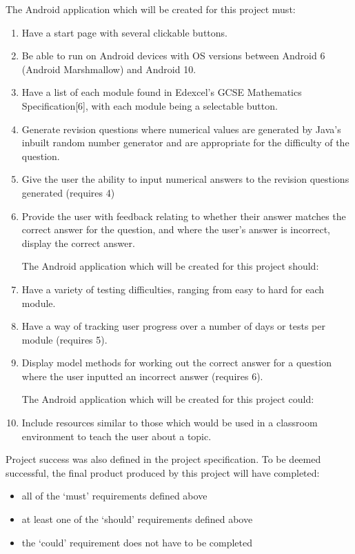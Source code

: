 \documentclass{article}
\begin{document}
The Android application which will be created for this project must: 

\begin{enumerate}
	\item Have a start page with several clickable buttons.
	\item Be able to run on Android devices with OS versions between Android 6 (Android Marshmallow) and Android 10.
	\item Have a list of each module found in Edexcel's GCSE Mathematics Specification[6], with each module being a selectable button.
	\item Generate revision questions where numerical values are generated by Java's inbuilt random number generator and are appropriate for the difficulty of the question.
	\item Give the user the ability to input numerical answers to the revision questions generated (requires 4)
	\item Provide the user with feedback relating to whether their answer matches the correct answer for the question, and where the user’s answer is incorrect, display the correct answer. \par
	
	The Android application which will be created for this project should:
	\item Have a variety of testing difficulties, ranging from easy to hard for each module.
	\item Have a way of tracking user progress over a number of days or tests per module (requires 5).
	\item Display model methods for working out the correct answer for a question where the user inputted an incorrect answer (requires 6). \par
	
	The Android application which will be created for this project could:
	\item Include resources similar to those which would be used in a classroom environment to teach the user about a topic. \par
\end{enumerate}

Project success was also defined in the project specification. To be deemed successful, the final product produced by this project will have completed: 

\begin{itemize}
	\item all of the `must' requirements defined above
	\item at least one of the `should' requirements defined above
	\item the `could' requirement does not have to be completed
\end{itemize}
\end{document}
